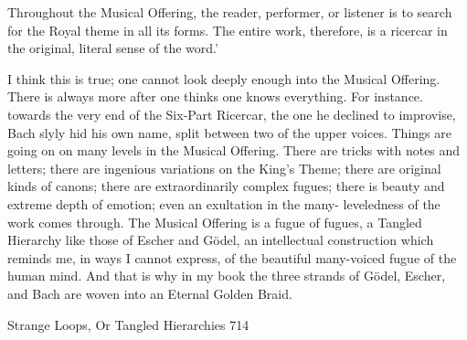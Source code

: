   Throughout the Musical Offering, the reader, performer, or listener is to search for
  the Royal theme in all its forms. The entire work, therefore, is a ricercar in the
  original, literal sense of the word.'

I think this is true; one cannot look deeply enough into the Musical Offering. There is
always more after one thinks one knows everything. For instance. towards the very end of
the Six-Part Ricercar, the one he declined to improvise, Bach slyly hid his own name,
split between two of the upper voices. Things are going on on many levels in the Musical
Offering. There are tricks with notes and letters; there are ingenious variations on the
King's Theme; there are original kinds of canons; there are extraordinarily complex
fugues; there is beauty and extreme depth of emotion; even an exultation in the many-
leveledness of the work comes through. The Musical Offering is a fugue of fugues, a
Tangled Hierarchy like those of Escher and Gödel, an intellectual construction which
reminds me, in ways I cannot express, of the beautiful many-voiced fugue of the human
mind. And that is why in my book the three strands of Gödel, Escher, and Bach are
woven into an Eternal Golden Braid.




Strange Loops, Or Tangled Hierarchies                                                 714

